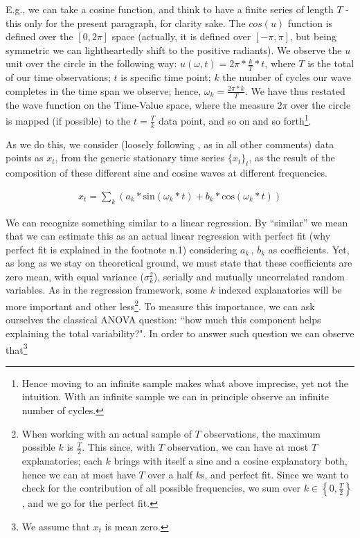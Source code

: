 \documentclass[12pt]{article} %
\begin{document}
E.g., we can take a cosine function, and think to have a finite series of length $T$ - this only for the present paragraph, for clarity sake. The $cos(u)$ function is defined over the $[0,2\pi]$ space (actually, it is defined over $[-\pi,\pi]$, but being symmetric we can lightheartedly shift to the positive radiants). We observe the $u$ unit over the circle in the following way: $u(\omega, t)=2\pi*\frac{k}{T}*t$, where $T$ is the total of our time observations; $t$ is specific time point; $k$ the number of cycles our wave completes in the time span we observe; hence, $\omega_k=\frac{2\pi*k}{T}$.  We have thus restated the wave function on the Time-Value space, where the measure $2\pi$ over the circle is mapped (if possible) to the $t=\frac{T}{k}$ data point, and so on and so forth\footnote{
Hence moving to an infinite sample makes what above imprecise, yet not the intuition. With an infinite sample we can in principle observe an infinite number of cycles.}.

As we do this, we consider (loosely following \citet{hammy}, as in all other comments) data points as $x_t$, from the generic stationary time series $\{x_t\}_t$, as the result of the composition of these different sine and cosine waves at different frequencies. 

\begin{equation}
\begin{aligned}
x_t=\sum_k(a_k*\text{sin}(\omega_k*t)+b_k*\text{cos}(\omega_k*t))
\end{aligned}
\end{equation}

We can recognize something similar to a linear regression. By ``similar'' we mean that we can estimate this as an actual linear regression with perfect fit (why perfect fit is explained in the footnote n.1) considering $a_k\,,\,b_k$ as coefficients. Yet, as long as we stay on theoretical ground, we must state that these coefficients are zero mean, with equal variance ($\sigma_k^2$), serially and mutually uncorrelated random variables. As in the regression framework, some $k$ indexed explanatories will be more important and other less\footnote{
When working with an actual sample of $T$ observations, the maximum possible $k$ is $\frac{T}{2}$. This since, with $T$ observation, we can have at most $T$ explanatories; each $k$ brings with itself a sine and a cosine explanatory both, hence we can at most have $T$ over a half $k$s, and perfect fit. Since we want to check for the contribution of all possible frequencies, we sum over $k\in\left\{0,\frac{T}{2}\right\}$, and we go for the perfect fit.}. To measure this importance, we can ask ourselves the classical ANOVA question: ``how much this component helps explaining the total variability?". In order to answer such question we can observe that\footnote{We assume that $x_t$ is mean zero.}
\end{document}
